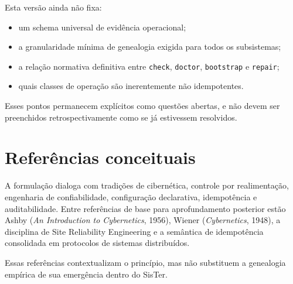 Esta versão ainda não fixa:

\begin{itemize}
  \item um schema universal de evidência operacional;
  \item a granularidade mínima de genealogia exigida para todos os subsistemas;
  \item a relação normativa definitiva entre \texttt{check}, \texttt{doctor},
  \texttt{bootstrap} e \texttt{repair};
  \item quais classes de operação são inerentemente não idempotentes.
\end{itemize}

Esses pontos permanecem explícitos como questões abertas, e não devem ser
preenchidos retrospectivamente como se já estivessem resolvidos.

\section{Referências conceituais}

A formulação dialoga com tradições de cibernética, controle por realimentação,
engenharia de confiabilidade, configuração declarativa, idempotência e
auditabilidade. Entre referências de base para aprofundamento posterior estão
Ashby (\emph{An Introduction to Cybernetics}, 1956), Wiener
(\emph{Cybernetics}, 1948), a disciplina de Site Reliability Engineering e a
semântica de idempotência consolidada em protocolos de sistemas distribuídos.

Essas referências contextualizam o princípio, mas não substituem a genealogia
empírica de sua emergência dentro do SisTer.
